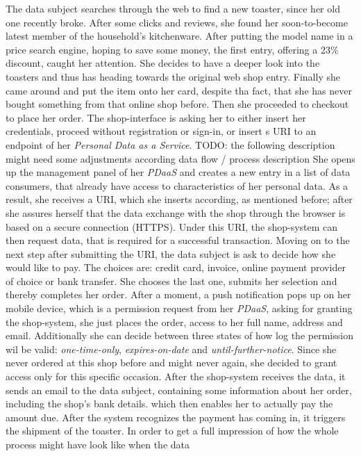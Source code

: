 \documentclass[12pt,english,a4paper,titlepage,cleardoublepage=empty,dottedtoc]{report}
\begin{document}
The data subject searches through the web to find a new toaster, since
her old one recently broke. After some clicks and reviews, she found her
soon-to-become latest member of the household's kitchenware. After
putting the model name in a price search engine, hoping to save some
money, the first entry, offering a 23\% discount, caught her attention.
She decides to have a deeper look into the toasters and thus has heading
towards the original web shop entry. Finally she came around and put the
item onto her card, despite tha fact, that she has never bought
something from that online shop before. Then she proceeded to checkout
to place her order. The shop-interface is asking her to either insert
her credentials, proceed without registration or sign-in, or insert s
URI to an endpoint of her \emph{Personal Data as a Service}. TODO: the
following description might need some adjustments according data flow /
process description She opens up the management panel of her
\emph{PDaaS} and creates a new entry in a list of data consumers, that
already have access to characteristics of her personal data. As a
result, she receives a URI, which she inserts according, as mentioned
before; after she assures herself that the data exchange with the shop
through the browser is based on a secure connection (HTTPS). Under this
URI, the shop-system can then request data, that is required for a
successful transaction. Moving on to the next step after submitting the
URI, the data subject is ask to decide how she would like to pay. The
choices are: credit card, invoice, online payment provider of choice or
bank transfer. She chooses the last one, submits her selection and
thereby completes her order. After a moment, a push notification pops up
on her mobile device, which is a permission request from her
\emph{PDaaS}, asking for granting the shop-system, she just places the
order, access to her full name, address and email. Additionally she can
decide between three states of how log the permission wil be valid:
\emph{one-time-only}, \emph{expires-on-date} and
\emph{until-further-notice}. Since she never ordered at this shop before
and might never again, she decided to grant access only for this
specific occasion. After the shop-system receives the data, it sends an
email to the data subject, containing some information about her order,
including the shop's bank details. which then enables her to actually
pay the amount due. After the system recognizes the payment has coming
in, it triggers the shipment of the toaster. In order to get a full
impression of how the whole process might have look like when the data
\end{document}
